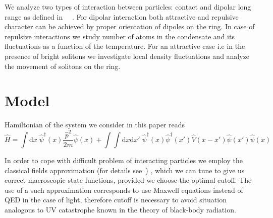 \documentclass{article}
\begin{document}
     We analyze two types of interaction between particles: contact and dipolar long range as defined in ~\cite{sinha2007cold}~\cite{PhysRevA.61.041604}. %
    For dipolar interaction both attractive and repulsive character can be achieved by proper orientation of dipoles on the ring. 
    In case of repulsive interactions we study number of atoms in the condensate and its fluctuations as a function of the temperature. For an attractive case i.e in the presence of bright solitons we investigate local density fluctuations and analyze the movement of solitons on the ring.
\section{Model}
    Hamiltonian of the system we consider in this paper reads
    \begin{equation}
    \label{H}
        \hat{H} = \int \mathrm{d}x \; {\hat{\psi}}^{\dag}(x) \frac{\hat{p}^2}{2m} \hat{\psi}(x) + \int \int \mathrm{d}x \mathrm{d}x' \; {\hat{\psi}}^{\dag}(x) {\hat{\psi}}^{\dag}(x') \hat{V}(x-x')\hat{\psi}(x') \hat{\psi}(x)
    \end{equation}
    
    In order to cope with difficult problem of interacting particles we employ the classical fields approximation (for details see~\cite{brewczyk2007classical}) , which we can tune to give us correct macroscopic state functions, provided we choose the optimal cutoff.
    The use of a such approximation corresponds to use Maxwell equations instead of QED in the case of light, therefore cutoff is necessary to avoid situation analogous to UV catastrophe known in the theory of black-body radiation.
    
\end{document}
